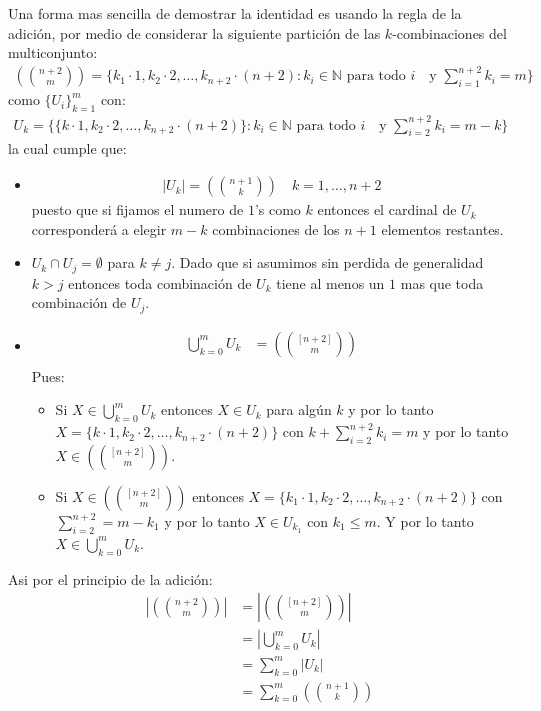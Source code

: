 \begin{solucion}
Una forma mas sencilla de demostrar la identidad es usando la regla de la adición, por medio de considerar la siguiente partición de las $k$-combinaciones del multiconjunto:
\begin{align*}
\left(\binom{n+2}{m}\right) = \{k_1\cdot 1, k_2\cdot 2, \ldots, k_{n+2}\cdot (n+2):k_i \in \mathbb N \text{ para todo $i$ } \text{ y } \sum_{i=1}^{n+2} k_i = m\}
\end{align*}
como $\{U_i\}_{k=1}^{m}$ con:
\begin{align*}
    U_k = \{\{k\cdot 1, k_2\cdot 2, \ldots, k_{n+2}\cdot (n+2)\}:k_i \in \mathbb N \text{ para todo $i$ } \text{ y } \sum_{i=2}^{n+2} k_i = m - k\}
\end{align*}
la cual cumple que:
\begin{itemize}
    \item 
    \begin{align*}
    \left|U_k\right| = \left(\binom{n+1}{k}\right) \quad k = 1, \ldots, n+2
\end{align*}
puesto que si fijamos el numero de $1$'s como $k$ entonces el cardinal de $U_k$ corresponderá a elegir $m-k$ combinaciones de los $n+1$ elementos restantes.
    \item $U_k \cap U_j = \emptyset$ para $k \neq j$. Dado que si asumimos sin perdida de generalidad $k>j$ entonces toda combinación de $U_k$ tiene al menos un $1$ mas que toda combinación de $U_j$.
    \item 
    \begin{align*}
        \bigcup_{k=0}^m U_k &= \left(\binom{[n+2]}{m}\right) \\
    \end{align*}
    Pues:
    \begin{itemize}
        \item [$\subseteq$] Si $X \in \bigcup_{k=0}^m U_k$ entonces $X \in U_k$ para algún $k$ y por lo tanto $X = \{k \cdot 1, k_2\cdot 2, \ldots, k_{n+2}\cdot (n+2)\}$ con $k+ \sum_{i=2}^{n+2} k_i = m$ y por lo tanto $X \in \left(\binom{[n+2]}{m}\right)$.
        \item [$\supseteq$] Si $X \in \left(\binom{[n+2]}{m}\right)$ entonces $X = \{k_1\cdot 1, k_2\cdot 2, \ldots, k_{n+2}\cdot (n+2)\}$ con $\sum_{i=2}^{n+2}  = m - k_1$ y por lo tanto $X \in U_{k_1}$ con $k_1\leq m$. Y por lo tanto $X \in \bigcup_{k=0}^m U_k$.
    \end{itemize}
\end{itemize} 

Asi por el principio de la adición:
\begin{align*}
     \left|\left(\binom{n+2}{m}\right) \right| &=
    \left|\left(\binom{[n+2]}{m}\right) \right|\\&= \left|\bigcup_{k=0}^m U_k\right|\\
    &= \sum_{k=0}^m \left|U_k\right|\\
    &= \sum_{k=0}^m \left(\binom{n+1}{k}\right)
\end{align*}

\end{solucion}